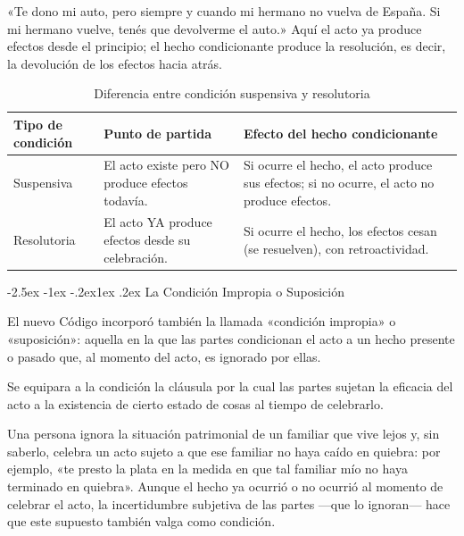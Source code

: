 \documentclass[12pt,oneside]{book}
\makeatletter
\renewcommand\subsection{\@startsection{subsection}{2}{\z@}%
  {-2.5ex \@plus -1ex \@minus -.2ex}{1ex \@plus .2ex}%
  {\normalfont\normalsize\bfseries}}
\makeatother
\begin{document}
\begin{ejemplo}
«Te dono mi auto, pero siempre y cuando mi hermano no vuelva de España. Si mi hermano vuelve, tenés que devolverme el auto.» Aquí el acto ya produce efectos desde el principio; el hecho condicionante produce la resolución, es decir, la devolución de los efectos hacia atrás.
\end{ejemplo}

\begin{table}[H]
\centering
\begin{tabularx}{\textwidth}{l X X}
\toprule
\textbf{Tipo de condición} & \textbf{Punto de partida} & \textbf{Efecto del hecho condicionante} \\
\midrule
Suspensiva & El acto existe pero NO produce efectos todavía. & Si ocurre el hecho, el acto produce sus efectos; si no ocurre, el acto no produce efectos. \\
Resolutoria & El acto YA produce efectos desde su celebración. & Si ocurre el hecho, los efectos cesan (se resuelven), con retroactividad. \\
\bottomrule
\end{tabularx}
\caption{Diferencia entre condición suspensiva y resolutoria}
\end{table}

\subsection{La Condición Impropia o Suposición}

El nuevo Código incorporó también la llamada «condición impropia» o «suposición»: aquella en la que las partes condicionan el acto a un hecho presente o pasado que, al momento del acto, es ignorado por ellas.

\begin{regla}
Se equipara a la condición la cláusula por la cual las partes sujetan la eficacia del acto a la existencia de cierto estado de cosas al tiempo de celebrarlo.
\end{regla}

\begin{ejemplo}
Una persona ignora la situación patrimonial de un familiar que vive lejos y, sin saberlo, celebra un acto sujeto a que ese familiar no haya caído en quiebra: por ejemplo, «te presto la plata en la medida en que tal familiar mío no haya terminado en quiebra». Aunque el hecho ya ocurrió o no ocurrió al momento de celebrar el acto, la incertidumbre subjetiva de las partes ---que lo ignoran--- hace que este supuesto también valga como condición.
\end{ejemplo}
\end{document}
